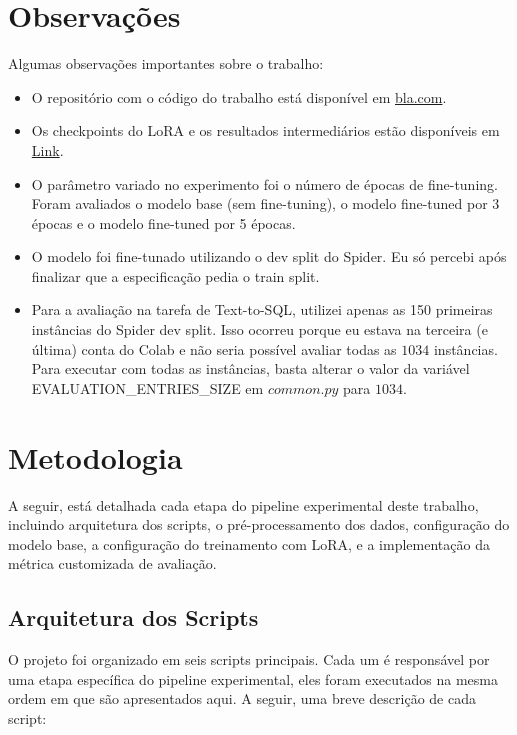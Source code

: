 \documentclass[journal,onecolumn]{IEEEtran}
\begin{document}
\section{Observações}
Algumas observações importantes sobre o trabalho:
\begin{itemize}
    \item O repositório com o código do trabalho está disponível em \url{bla.com}.
    \item Os checkpoints do LoRA e os resultados intermediários estão disponíveis em \href{https://drive.google.com/drive/folders/1VXzIdSLtCn5-leHEG6usvXw60Y5OzKKv?usp=sharing}{Link}.
    \item O parâmetro variado no experimento foi o número de épocas de fine-tuning. Foram avaliados o modelo base (sem fine-tuning), o modelo fine-tuned por 3 épocas e o modelo fine-tuned por 5 épocas.
    \item O modelo foi fine-tunado utilizando o dev split do Spider. Eu só percebi após finalizar que a especificação pedia o train split.
    \item Para a avaliação na tarefa de Text-to-SQL, utilizei apenas as 150 primeiras instâncias do Spider dev split. Isso ocorreu porque eu estava na terceira (e última) conta do Colab e não seria possível avaliar todas as $1034$ instâncias. Para executar com todas as instâncias, basta alterar o valor da variável EVALUATION\_ENTRIES\_SIZE em $common.py$ para $1034$.
\end{itemize}

\section{Metodologia}
 A seguir, está detalhada cada etapa do pipeline experimental deste trabalho, incluindo arquitetura dos scripts, o pré-processamento dos dados, configuração do modelo base, a configuração do treinamento com LoRA, e a implementação da métrica customizada de avaliação.

\subsection{Arquitetura dos Scripts}

O projeto foi organizado em seis scripts principais. Cada um é responsável por uma etapa específica do pipeline experimental, eles foram executados na mesma ordem em que são apresentados aqui. A seguir, uma breve descrição de cada script:
\end{document}
